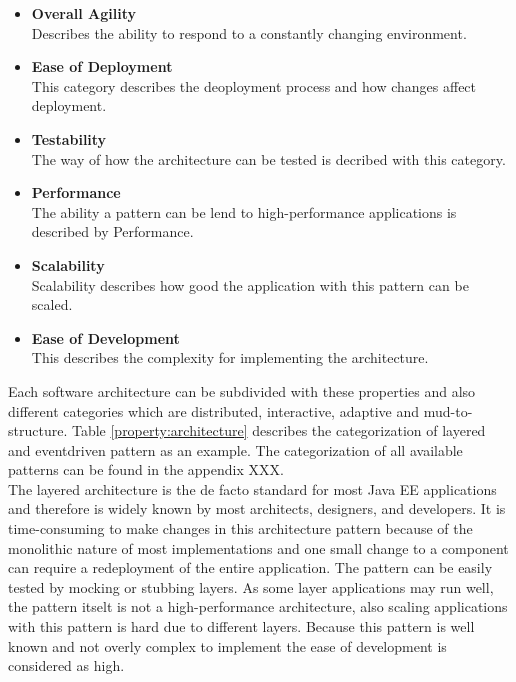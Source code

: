 \begin{itemize}
	\item \textbf{Overall Agility}\\Describes the ability to respond to a constantly changing environment.
	\item \textbf{Ease of Deployment}\\This category describes the deoployment process and how changes affect deployment.
	\item \textbf{Testability}\\The way of how the architecture can be tested is decribed with this category.
	\item \textbf{Performance}\\The ability a pattern can be lend to high-performance applications is described by Performance.
	\item \textbf{Scalability}\\Scalability describes how good the application with this pattern can be scaled.
	\item \textbf{Ease of Development}\\This describes the complexity for implementing the architecture.\\
\end{itemize}
Each software architecture can be subdivided with these properties and also different categories which are distributed, interactive, adaptive and mud-to-structure. Table \ref{property:architecture} describes the categorization of layered and eventdriven pattern as an example. The categorization of all available patterns can be found in the appendix XXX.\\
The layered architecture is the de facto standard for most Java EE applications and therefore is widely known by most architects, designers, and developers. It is time-consuming to make changes in this architecture pattern because of the monolithic nature of most implementations and one small change to a component can require a redeployment of the entire application. The pattern can be easily tested by mocking or stubbing layers. As some layer applications may run well, the pattern itselt is not a high-performance architecture, also scaling applications with this pattern is hard due to different layers. Because this pattern is well known and not overly complex to implement the ease of development is considered as high.\\
